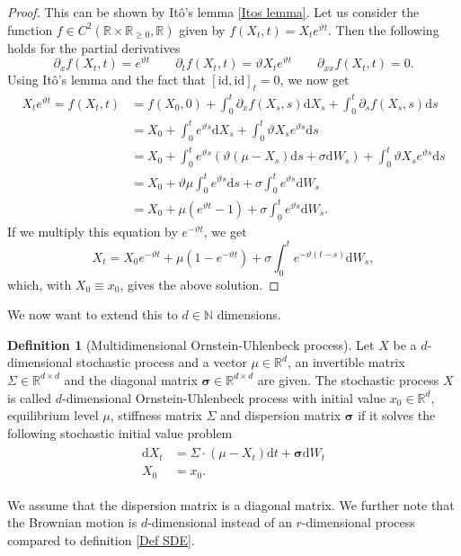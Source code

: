 \documentclass[11pt,titlepage]{article}
\newcommand{\R}{\mathbb{R}} %
\newcommand{\N}{\mathbb{N}} %
\theoremstyle{definition}
\newtheorem{definition}[theorem]{Definition}
\theoremstyle{remark}
\begin{document}
	\begin{proof}
		This can be shown by Itô's lemma \ref{Itos lemma}. Let us consider the function  
		$f\in C^2(\R\times\R_{\geq 0},\R)$ given by $f(X_t,t)=X_t e^{\vartheta t}$. Then the following holds for the partial derivatives
		\[\partial_x f(X_t,t)=e^{\vartheta t}\qquad \partial_t f(X_t,t)=\vartheta X_t e^{\vartheta t}
		\qquad \partial_{xx}f(X_t,t)=0.\] 
		Using Itô's lemma and the fact that $[\mathrm{id},\mathrm{id}]_t=0$, we now get
		\begin{align*}
			X_t e^{\vartheta t}=f(X_t,t)&=f(X_0,0) +\int_0^t \partial_x f(X_s,s)\mathrm{d}X_s +
			\int_0^t \partial_s f(X_s,s)\mathrm{d}s\\
			&=X_0 + \int_0^t e^{\vartheta s} \mathrm{d}X_s +
			\int_0^t \vartheta X_s e^{\vartheta s}\mathrm{d}s\\
			&=X_0 + \int_0^t e^{\vartheta s} (\vartheta(\mu -X_s)\mathrm{d}s +\sigma \mathrm{d}W_s) +
			\int_0^t \vartheta X_s e^{\vartheta s}\mathrm{d}s\\
			&=X_0 +\vartheta \mu \int_0^t e^{\vartheta s}\mathrm{d}s +
			\sigma \int_0^t e^{\vartheta s}\mathrm{d}W_s \\
			&=X_0 + \mu (e^{\vartheta t}-1) + \sigma \int_0^t e^{\vartheta s}\mathrm{d}W_s.
		\end{align*}
		If we multiply this equation by $e^{-\vartheta t}$, we get 
		\[X_t = X_0 e^{-\vartheta t} +\mu (1-e^{-\vartheta t}) +\sigma\int_0^t e^{-\vartheta(t-s)}\mathrm{d}W_s,\]
		which, with $X_0\equiv x_0$, gives the above solution.
	\end{proof}

	We now want to extend this to $d\in\N$ dimensions.
	
	\begin{definition}[Multidimensional Ornstein-Uhlenbeck process] \label{Def multidim  OUP}
		Let $X$ be a $d$-dimensional stochastic process and a vector $\mu\in\R^d$, 
		an invertible
		matrix $\Sigma\in\R^{d\times d}$ and the diagonal matrix $\boldsymbol{\sigma}\in\R^{d\times d}$
		are given. The stochastic process $X$ is called $d$-dimensional Ornstein-Uhlenbeck process with initial value $x_0\in\R^d$, equilibrium level $\mu$, stiffness matrix 
		$\Sigma$ and dispersion matrix $\boldsymbol{\sigma}$ 
		if it solves the following stochastic initial value problem
		\begin{align}
			\begin{split}
				\mathrm{d}X_t &= \Sigma\cdot (\mu-X_t)\mathrm{d}t +\boldsymbol{\sigma} \mathrm{d}W_t\\
				X_0&=x_0. \label{ddim_OUP}
			\end{split}
		\end{align}
	\end{definition}
	\noindent
	We assume that the dispersion matrix is a diagonal matrix. 
	We further note that the Brownian motion is $d$-dimensional instead of an $r$-dimensional process compared to definition \ref{Def SDE}.
	
\end{document}
